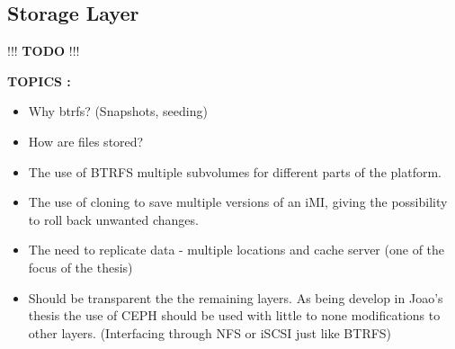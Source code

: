 \subsection{Storage Layer}
\label{sub:icbd_architecture_storage}

!!! \textbf{TODO} !!!

\textbf{TOPICS :}
\begin{itemize}
	\item Why btrfs? (Snapshots, seeding)
	\item How are files stored?
	\item The use of BTRFS multiple subvolumes for different parts of the platform.
	\item The use of cloning to save multiple versions of an iMI, giving the possibility to roll back unwanted changes.
	\item The need to replicate data - multiple locations and cache server (one of the focus of the thesis)
	\item Should be transparent the the remaining layers. As being develop in Joao's thesis the use of CEPH  should be used with little to none modifications to other layers. (Interfacing through NFS or iSCSI just like BTRFS)
\end{itemize}







